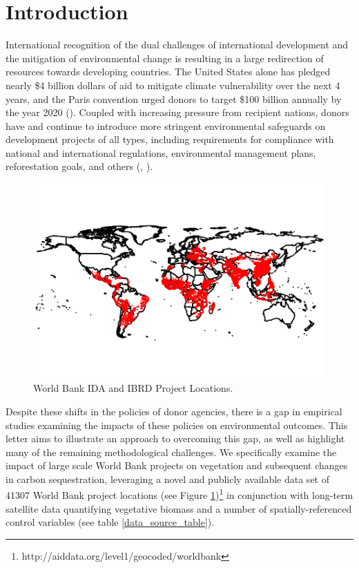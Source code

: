 \documentclass{article}\usepackage[]{graphicx}\usepackage[]{color}
\makeatletter
\def\maxwidth{ %
  \ifdim\Gin@nat@width>\linewidth
    \linewidth
  \else
    \Gin@nat@width
  \fi
}
\newenvironment{knitrout}{}{}  %
\makeatother
\begin{document}
\begin{knitrout}
\newpage
\section{Introduction}

International recognition of the dual challenges of international development and the mitigation of environmental change is resulting in a large redirection of resources towards developing countries. 
The United States alone has pledged nearly \$4 billion dollars of aid to mitigate climate vulnerability over the next 4 years, and the Paris convention urged donors to target \$100 billion annually by the year 2020 (\cite{royal_united_2015}). 
Coupled with increasing pressure from recipient nations, donors have and continue to introduce more stringent environmental safeguards on development projects of all types, including requirements for compliance with national and international regulations, environmental management plans, reforestation goals, and others (\cite{nielson_delegation_2003}, \cite{gutner_explaining_2005}).

\begin{figure}\centering
\begin{Schunk}

\includegraphics[width=\maxwidth]{figure/WLocs-1} \end{Schunk}
\caption{World Bank IDA and IBRD Project Locations.}
\label{WBLocs}
\vspace{25pt}
\end{figure}  

\par

Despite these shifts in the policies of donor agencies, there is a gap in empirical studies examining the impacts of these policies on environmental outcomes.  
This letter aims to illustrate an approach to overcoming this gap, as well as highlight many of the remaining methodological challenges.
We specifically examine the impact of large scale World Bank projects on vegetation and subsequent changes in carbon sequestration, leveraging a novel and publicly available data set of 41307 World Bank project locations (see Figure \ref{WBLocs})\footnote{http://aiddata.org/level1/geocoded/worldbank} in conjunction with long-term satellite data quantifying vegetative biomass and a number of spatially-referenced control variables (see table \ref{data_source_table}).


\end{knitrout}
\end{document}

